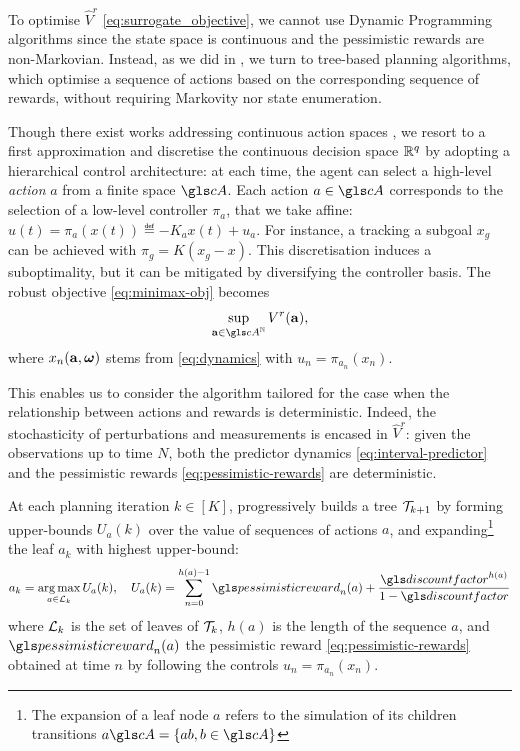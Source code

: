 To optimise $\hat{V}^r$ \eqref{eq:surrogate_objective}, we cannot use Dynamic Programming algorithms since the state space is continuous and the pessimistic rewards are non-Markovian. Instead, as we did in , we turn to tree-based planning algorithms, which optimise a sequence of actions based on the corresponding sequence of rewards, without requiring Markovity nor state enumeration.

Though there exist works addressing continuous action spaces \citep{Busoniu2018,Weinstein2012}, we resort to a first approximation and discretise the continuous decision space $\mathbb{R}^q$ by adopting a hierarchical control architecture: at each time, the agent can select a high-level \emph{action} $a$ from a finite space $\cA$. Each action $a\in\cA$ corresponds to the selection of a low-level controller $\pi_a$, that we take affine: $u(t) = \pi_a(x(t)) \eqdef -K_a x(t) + u_a.$ For instance, a tracking a subgoal $x_g$ can be achieved with $\pi_g = K(x_g - x)$. This discretisation induces a suboptimality, but it can be mitigated by diversifying the controller basis.
The robust objective \eqref{eq:minimax-obj} becomes
\[\sup_{\ba\in{\cA}^\Natural} V^r(\ba),\]
where $x_n(\mathbf{a}, \bm{\omega})$ stems from \eqref{eq:dynamics} with $u_n = \pi_{a_n}(x_n)$.

This enables us to consider the \OPD algorithm \citep{Hren2008} tailored for the case when the relationship between actions and rewards is deterministic. Indeed, the stochasticity of perturbations and measurements is encased in $\hat{V}^r$: given the observations up to time $N$, both the predictor dynamics \eqref{eq:interval-predictor} and the pessimistic rewards \eqref{eq:pessimistic-rewards} are deterministic.

At each planning iteration $k\in[K]$, \OPD progressively builds a tree $\mathcal{T}_{k+1}$ by forming upper-bounds $U_a(k)$ over the value of sequences of actions $a$, and expanding\footnote{The expansion of a leaf node $a$ refers to the simulation of its children transitions $a\cA = \{ab, b\in \cA\}$} the leaf $a_k$ with highest upper-bound:
\begin{equation}
\label{eq:opd}
a_k = \argmax_{a\in\cL_k} U_a(k), \quad U_a(k) = \sum_{n=0}^{h(a)-1} \pessimisticreward_n(a) + \frac{\discount^{h(a)}}{1-\discount}
\end{equation}
where $\mathcal{L}_k$ is the set of leaves of $\mathcal{T}_k$, $h(a)$ is the length of the sequence $a$, and $\pessimisticreward_n(a)$ the pessimistic reward \eqref{eq:pessimistic-rewards} obtained at time $n$ by following the controls $u_n = \pi_{a_n}(x_n)$.

